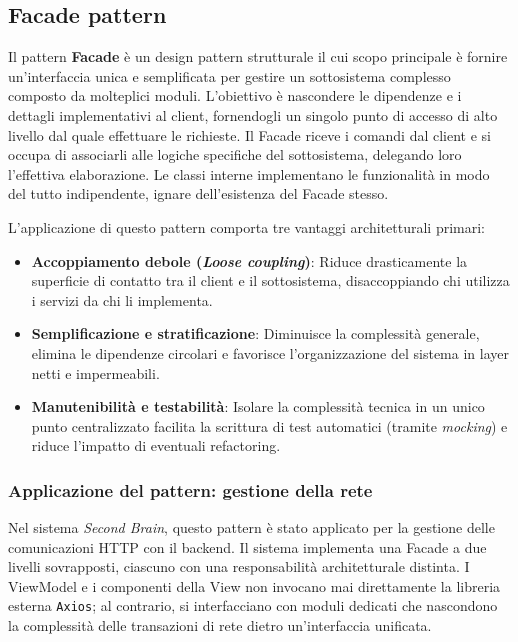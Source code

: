 \documentclass[11pt,a4paper]{article}
\begin{document}
\subsection{Facade pattern}
Il pattern \textbf{Facade} è un design pattern strutturale il cui scopo principale è fornire un'interfaccia unica e semplificata per gestire un sottosistema complesso composto da molteplici moduli.
L'obiettivo è nascondere le dipendenze e i dettagli implementativi al client, fornendogli un singolo punto di accesso di alto livello dal quale effettuare le richieste. Il Facade riceve i comandi dal client e si occupa di associarli alle logiche specifiche del sottosistema, delegando loro l'effettiva elaborazione. Le classi interne implementano le funzionalità in modo del tutto indipendente, ignare dell'esistenza del Facade stesso.

L'applicazione di questo pattern comporta tre vantaggi architetturali primari:
\begin{itemize}
    \item \textbf{Accoppiamento debole (\textit{Loose coupling})}: Riduce drasticamente la superficie di contatto tra il client e il sottosistema, disaccoppiando chi utilizza i servizi da chi li implementa.
    \item \textbf{Semplificazione e stratificazione}: Diminuisce la complessità generale, elimina le dipendenze circolari e favorisce l'organizzazione del sistema in layer netti e impermeabili.
    \item \textbf{Manutenibilità e testabilità}: Isolare la complessità tecnica in un unico punto centralizzato facilita la scrittura di test automatici (tramite \textit{mocking}) e riduce l'impatto di eventuali refactoring.
\end{itemize}

\subsubsection{Applicazione del pattern: gestione della rete}
Nel sistema \textit{Second Brain}, questo pattern è stato applicato per la gestione delle comunicazioni HTTP con il backend. Il sistema implementa una Facade a due livelli sovrapposti, ciascuno con una responsabilità architetturale distinta. I ViewModel e i componenti della View non invocano mai direttamente la libreria esterna \texttt{Axios}; al contrario, si interfacciano con moduli dedicati che nascondono la complessità delle transazioni di rete dietro un'interfaccia unificata.
\end{document}
